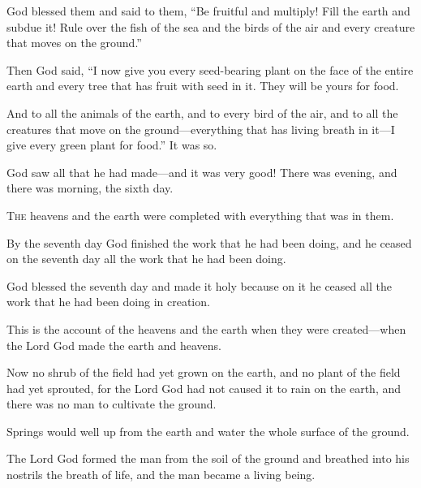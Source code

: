 \begin{scripture}
 God blessed them and said to them, ``Be fruitful and multiply! Fill the earth and subdue it! Rule over the fish of the sea and the birds of the air and every creature that moves on the ground.''
 Then God said, ``I now give you every seed-bearing plant on the face of the entire earth and every tree that has fruit with seed in it. They will be yours for food.
 And to all the animals of the earth, and to every bird of the air, and to all the creatures that move on the ground---everything that has living breath in it---I give every green plant for food.'' It was so.
\everypar{}

 God saw all that he had made---and it was very good! There was evening, and there was morning, the sixth day.

 \allowchapbreak\hypertarget{ch-genesis-2}{}\lettrine[lines=5]{\color{pentateuch}T}{\textsc{he}} heavens and the earth were completed with everything that was in them.\everypar{}
 By the seventh day God finished the work that he had been doing, and he ceased on the seventh day all the work that he had been doing.
 God blessed the seventh day and made it holy because on it he ceased all the work that he had been doing in creation.
\everypar{}

 This is the account of the heavens and the earth when they were created---when the Lord God made the earth and heavens.
\everypar{}

 Now no shrub of the field had yet grown on the earth, and no plant of the field had yet sprouted, for the Lord God had not caused it to rain on the earth, and there was no man to cultivate the ground.
 Springs would well up from the earth and water the whole surface of the ground.
 The Lord God formed the man from the soil of the ground and breathed into his nostrils the breath of life, and the man became a living being.
\everypar{}


\end{scripture}
